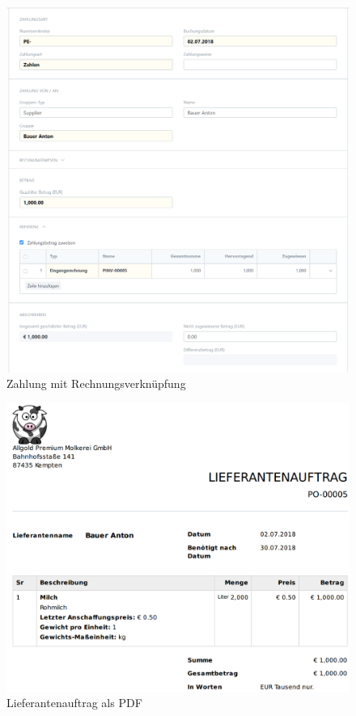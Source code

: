 \begin{figure}[H]
  \centering
  \includegraphics[width=\textwidth]{Bilder/Zahlung.PNG}
  \caption{Zahlung mit Rechnungsverknüpfung}
  \label{fig:zahlung}
\end{figure}
\begin{figure}[H]
  \centering
  \includegraphics[width=\textwidth]{Bilder/Auftrag_Mail.PNG}
  \caption{Lieferantenauftrag als PDF}
  \label{fig:auftrPdf}
\end{figure}
